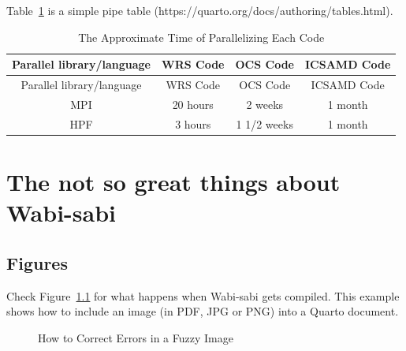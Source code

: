 \documentclass[
  dissertation]{bsu-cs}
\begin{document}
Table~\ref{tbl-table4} is a simple pipe table
(https://quarto.org/docs/authoring/tables.html).

\begin{longtable}[]{@{}cccc@{}}
\caption{The Approximate Time of Parallelizing Each
Code}\label{tbl-table4}\tabularnewline
\toprule\noalign{}
Parallel library/language & WRS Code & OCS Code & ICSAMD Code \\
\midrule\noalign{}
\endfirsthead
\toprule\noalign{}
Parallel library/language & WRS Code & OCS Code & ICSAMD Code \\
\midrule\noalign{}
\endhead
\bottomrule\noalign{}
\endlastfoot
MPI & 20 hours & 2 weeks & 1 month \\
HPF & 3 hours & 1 1/2 weeks & 1 month \\
\end{longtable}

\chapter{The not so great things about Wabi-sabi}

\section{Figures}\label{figures}

Check Figure~\ref{fig-fuzzyImage} for what happens when Wabi-sabi gets
compiled. This example shows how to include an image (in PDF, JPG or
PNG) into a Quarto document.

\begin{figure}


\caption{\label{fig-fuzzyImage}How to Correct Errors in a Fuzzy Image}

\end{figure}%
\end{document}
